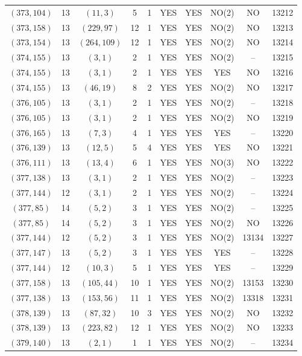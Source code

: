 \begin{longtable}{|c|c|c|c|c|c|c|c|c|c|}
$(373, 104)$ & 13 & $(11, 3)$ & 5 & 1 & YES & YES & NO(2) & NO & 13212\\
$(373, 158)$ & 13 & $(229, 97)$ & 12 & 1 & YES & YES & NO(2) & NO & 13213\\
$(373, 154)$ & 13 & $(264, 109)$ & 12 & 1 & YES & YES & NO(2) & NO & 13214\\
$(374, 155)$ & 13 & $(3, 1)$ & 2 & 1 & YES & YES & NO(2) & -- & 13215\\
$(374, 155)$ & 13 & $(3, 1)$ & 2 & 1 & YES & YES & YES & NO & 13216\\
$(374, 155)$ & 13 & $(46, 19)$ & 8 & 2 & YES & YES & NO(2) & NO & 13217\\
$(376, 105)$ & 13 & $(3, 1)$ & 2 & 1 & YES & YES & NO(2) & -- & 13218\\
$(376, 105)$ & 13 & $(3, 1)$ & 2 & 1 & YES & YES & NO(2) & NO & 13219\\
$(376, 165)$ & 13 & $(7, 3)$ & 4 & 1 & YES & YES & YES & -- & 13220\\
$(376, 139)$ & 13 & $(12, 5)$ & 5 & 4 & YES & YES & YES & NO & 13221\\
$(376, 111)$ & 13 & $(13, 4)$ & 6 & 1 & YES & YES & NO(3) & NO & 13222\\
$(377, 138)$ & 13 & $(3, 1)$ & 2 & 1 & YES & YES & NO(2) & -- & 13223\\
$(377, 144)$ & 12 & $(3, 1)$ & 2 & 1 & YES & YES & NO(2) & -- & 13224\\
$(377, 85)$ & 14 & $(5, 2)$ & 3 & 1 & YES & YES & NO(2) & -- & 13225\\
$(377, 85)$ & 14 & $(5, 2)$ & 3 & 1 & YES & YES & NO(2) & NO & 13226\\
$(377, 144)$ & 12 & $(5, 2)$ & 3 & 1 & YES & YES & NO(2) & 13134 & 13227\\
$(377, 147)$ & 13 & $(5, 2)$ & 3 & 1 & YES & YES & YES & -- & 13228\\
$(377, 144)$ & 12 & $(10, 3)$ & 5 & 1 & YES & YES & YES & -- & 13229\\
$(377, 158)$ & 13 & $(105, 44)$ & 10 & 1 & YES & YES & NO(2) & 13153 & 13230\\
$(377, 138)$ & 13 & $(153, 56)$ & 11 & 1 & YES & YES & NO(2) & 13318 & 13231\\
$(378, 139)$ & 13 & $(87, 32)$ & 10 & 3 & YES & YES & NO(2) & NO & 13232\\
$(378, 139)$ & 13 & $(223, 82)$ & 12 & 1 & YES & YES & NO(2) & NO & 13233\\
$(379, 140)$ & 13 & $(2, 1)$ & 1 & 1 & YES & YES & NO(2) & -- & 13234\\

\end{longtable}
